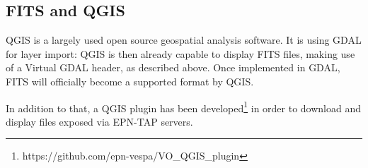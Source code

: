\subsection{FITS and QGIS}
QGIS is a largely used open source geospatial analysis software.
It is using GDAL for layer import: QGIS is then already capable to display FITS files,
making use of a Virtual GDAL header, as described above.
\DIFaddbegin {}\DIFaddend Once implemented in GDAL, FITS will officially become a supported format by QGIS.

In addition to that, a QGIS plugin has been developed\footnote{https://github.com/epn-vespa/VO\_QGIS\_plugin}
\DIFdelbegin {}\DIFdelend \DIFaddbegin {}\DIFaddend in order to download and display files exposed via EPN-TAP servers.

